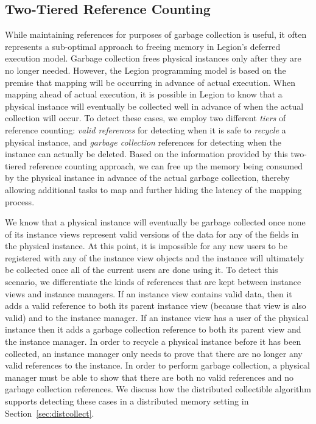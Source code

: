 \subsection{Two-Tiered Reference Counting}
\label{subsec:twotier}
While maintaining references for purposes of garbage
collection is useful, it often represents a sub-optimal
approach to freeing memory in Legion's deferred execution
model. Garbage collection frees physical instances only
after they are no longer needed.  However, the Legion
programming model is based on the premise that mapping
will be occurring in advance of actual execution. When
mapping ahead of actual execution, it is possible in 
Legion to know that a physical instance will eventually
be collected well in advance of when the actual 
collection will occur. To detect these cases, we employ
two different {\em tiers} of reference counting: 
{\em valid references} for detecting when it is safe to 
{\em recycle} a physical instance, and {\em garbage 
collection} references for detecting when the instance can
actually be deleted. Based on the information provided
by this two-tiered reference counting approach, we can
free up the memory being consumed by the physical
instance in advance of the actual garbage collection,
thereby allowing additional tasks to map and further
hiding the latency of the mapping process.

We know that a physical instance will eventually be 
garbage collected once none of its instance views represent
valid versions of the data for any of the fields in the
physical instance. At this point, it is impossible for 
any new users to be registered with any of the instance 
view objects and the instance will ultimately be collected 
once all of the current users are done using it. To
detect this scenario, we differentiate the kinds of 
references that are kept between instance views and
instance managers. If an instance view contains valid
data, then it adds a valid reference to both its 
parent instance view (because that view is also valid)
and to the instance manager.  If an instance view has a user of
the physical instance then it adds a garbage collection 
reference to both its parent view and the instance manager. 
In order to recycle a physical instance before it has been 
collected, an instance manager only needs to prove that
there are no longer any valid references to the 
instance.  In order to perform garbage collection, a 
physical manager must be able to show that there are 
both no valid references and no garbage collection 
references. We discuss how the distributed collectible 
algorithm supports detecting these cases in a distributed
memory setting in Section~\ref{sec:distcollect}.

